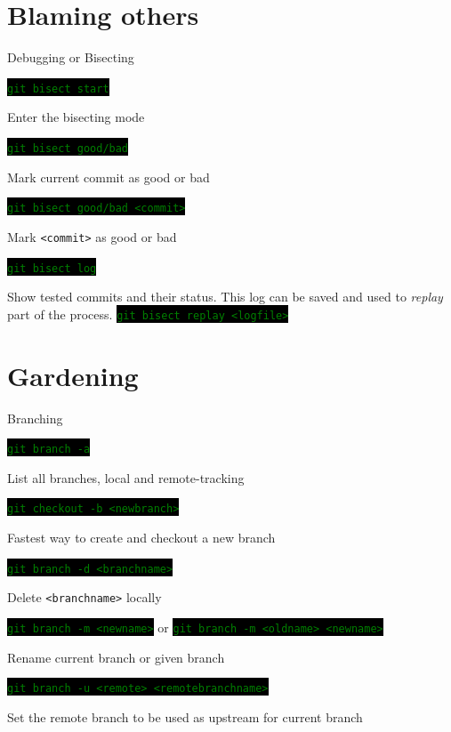 \documentclass[
14pt,
aspectratio=169,
usenames,
dvipsnames,
x11names]{beamer}
\newcommand{\code}[1]{{\small\colorbox{black}{\textcolor{green}{\texttt{#1}}}}}
\begin{document}
\section{Blaming others}

\begin{frame}{Debugging or Bisecting}

  \code{git bisect start}

  Enter the bisecting mode

  \vfill
  \pause

  \code{git bisect good/bad}

  Mark current commit as good or bad

  \vfill
  \pause

  \code{git bisect good/bad <commit>}

  Mark \texttt{<commit>} as good or bad

  \vfill
  \pause

  \code{git bisect log}

  Show tested commits and their status.
  This log can be saved and used to \textit{replay} part of the process.
  \code{git bisect replay <logfile>}

\end{frame}

\section{Gardening}

\begin{frame}{Branching}

  \code{git branch -a}

  List all branches, local and remote-tracking

  \vfill
  \pause

  \code{git checkout -b <newbranch>}

  Fastest way to create and checkout a new branch

  \vfill
  \pause

  \code{git branch -d <branchname>}

  Delete \texttt{<branchname>} locally

  \vfill
  \pause

  \code{git branch -m <newname>} or \code{git branch -m <oldname> <newname>}

  Rename current branch or given branch

  \vfill
  \pause

  \code{git branch -u <remote> <remotebranchname>}

  Set the remote branch to be used as upstream for current branch

\end{frame}
\end{document}
